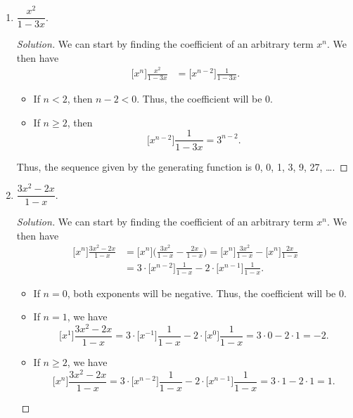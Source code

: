 \documentclass{article}
\newenvironment{solution}
  {\renewcommand\qedsymbol{$\blacksquare$}\begin{proof}[Solution]}
  {\end{proof}}
\begin{document}
\begin{enumerate}
\begin{solution}
    \end{solution}
    \colorbox{CornflowerBlue}{
    \begin{minipage}[c]{0.9\textwidth}
        \centering
        For items \#13 to \#16, we need to find the underlying sequence that is represented by the given generating functions.
    \end{minipage}
    }
    \item $ \dfrac{x^2}{1-3x} $.\begin{solution}
        We can start by finding the coefficient of an arbitrary term $x^n$. We then have\begin{align*} 
            \big[x^n\big] \frac{x^2}{1-3x} &= \big[x^{n-2}\big] \frac{1}{1-3x}. 
        \end{align*}\begin{itemize} 
            \item If $n<2$, then $n-2 <0$. Thus, the coefficient will be 0. 
            \item If $n\geq 2$, then\[
                \big[x^{n-2}\big] \frac{1}{1-3x} = 3^{n-2}. 
            \]
        \end{itemize} 
        Thus, the sequence given by the generating function is 0, 0, 1, 3, 9, 27, \ldots. 
    \end{solution} 
    \item $ \dfrac{3x^2 -2x}{1-x} $.\begin{solution}
        We can start by finding the coefficient of an arbitrary term $x^n$. We then have\begin{align*}
            \big[x^n\big] \frac{3x^2 -2x}{1-x} &= \big[x^n\big] \bigg(\frac{3x^2}{1-x} - \frac{2x}{1-x}\bigg) = \big[x^n\big] \frac{3x^2}{1-x} - \big[x^n\big] \frac{2x}{1-x} \\
            &= 3\cdot \big[x^{n-2}\big] \frac{1}{1-x} - 2\cdot \big[x^{n-1}\big] \frac{1}{1-x}. 
        \end{align*}\begin{itemize} 
            \item If $n=0$, both exponents will be negative. Thus, the coefficient will be 0. 
            \item If $n=1$, we have\[
                \big[x^1\big] \frac{3x^2 -2x}{1-x} = 3\cdot \big[x^{-1}\big] \frac{1}{1-x} - 2\cdot \big[x^{0}\big] \frac{1}{1-x} = 3\cdot 0 - 2\cdot 1 = -2.
            \]
            \item If $n\geq 2$, we have\[
                \big[x^n\big] \frac{3x^2 -2x}{1-x} = 3\cdot \big[x^{n-2}\big] \frac{1}{1-x} - 2\cdot \big[x^{n-1}\big] \frac{1}{1-x} = 3\cdot 1 - 2\cdot 1 = 1. 
\]
\end{itemize}
\end{solution}
\end{enumerate}
\end{document}
